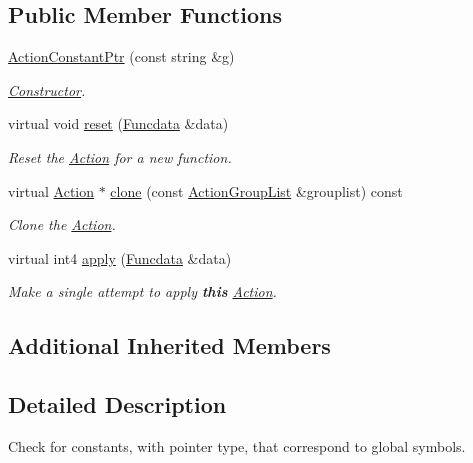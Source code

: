 \subsection*{Public Member Functions}
\begin{DoxyCompactItemize}
\item 
\mbox{\hyperlink{class_action_constant_ptr_a99f3b7ac26692122d7da9b5a7f61c255}{Action\+Constant\+Ptr}} (const string \&g)
\begin{DoxyCompactList}\small\item\em \mbox{\hyperlink{class_constructor}{Constructor}}. \end{DoxyCompactList}\item 
virtual void \mbox{\hyperlink{class_action_constant_ptr_a35b17f96c22959446ca3f94420a9f5a2}{reset}} (\mbox{\hyperlink{class_funcdata}{Funcdata}} \&data)
\begin{DoxyCompactList}\small\item\em Reset the \mbox{\hyperlink{class_action}{Action}} for a new function. \end{DoxyCompactList}\item 
virtual \mbox{\hyperlink{class_action}{Action}} $\ast$ \mbox{\hyperlink{class_action_constant_ptr_a03964225abf6a06d0b8eb832a94ce16a}{clone}} (const \mbox{\hyperlink{class_action_group_list}{Action\+Group\+List}} \&grouplist) const
\begin{DoxyCompactList}\small\item\em Clone the \mbox{\hyperlink{class_action}{Action}}. \end{DoxyCompactList}\item 
virtual int4 \mbox{\hyperlink{class_action_constant_ptr_a3667d599128a545967351ba54f4cce42}{apply}} (\mbox{\hyperlink{class_funcdata}{Funcdata}} \&data)
\begin{DoxyCompactList}\small\item\em Make a single attempt to apply {\bfseries{this}} \mbox{\hyperlink{class_action}{Action}}. \end{DoxyCompactList}\end{DoxyCompactItemize}
\subsection*{Additional Inherited Members}


\subsection{Detailed Description}
Check for constants, with pointer type, that correspond to global symbols. 

